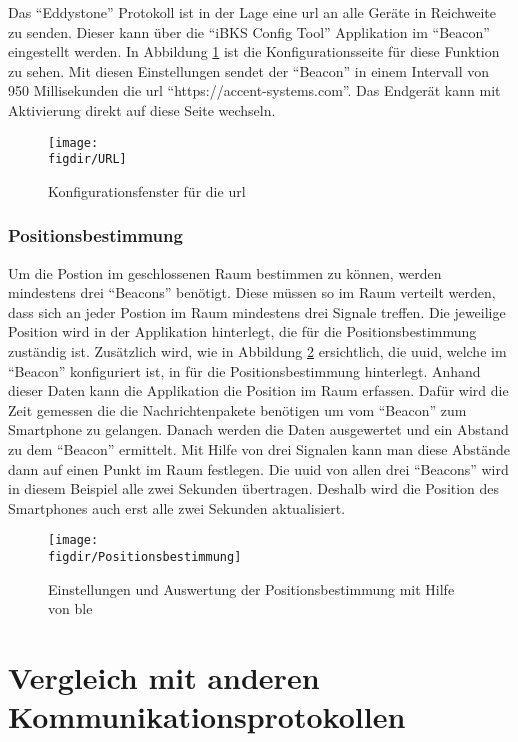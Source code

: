Das "`Eddystone"' Protokoll ist in der Lage eine \ac{url} an alle Geräte in Reichweite zu senden. Dieser kann über die "`iBKS Config Tool"' Applikation im "`Beacon"' eingestellt werden. In Abbildung \ref{FIG:url} ist die Konfigurationsseite für diese Funktion zu sehen. Mit diesen Einstellungen sendet der "`Beacon"' in einem Intervall von 950 Millisekunden die \ac{url} "`https://accent-systems.com"'. Das Endgerät kann mit Aktivierung direkt auf diese Seite wechseln.\\   

\begin{figure}[h]
	\centering
	\texttt{[image: \\figdir/URL]}
	\caption{Konfigurationsfenster für die \ac{url}}
	\label{FIG:url}
\end{figure}

\subsubsection{Positionsbestimmung}
\label{sss:ibeacon:position}

Um die Postion im geschlossenen Raum bestimmen zu können, werden mindestens drei "`Beacons"' benötigt. Diese müssen so im Raum verteilt werden, dass sich an jeder Postion im Raum mindestens drei Signale treffen. Die jeweilige Position wird in der Applikation hinterlegt, die für die Positionsbestimmung zuständig ist. Zusätzlich wird, wie in Abbildung \ref{FIG:poition} ersichtlich, die \ac{uuid}, welche im "`Beacon"' konfiguriert ist, in für die Positionsbestimmung hinterlegt. Anhand dieser Daten kann die Applikation die Position im Raum erfassen. Dafür wird die Zeit gemessen die die Nachrichtenpakete benötigen um vom "`Beacon"' zum Smartphone zu gelangen. Danach werden die Daten ausgewertet und ein Abstand zu dem "`Beacon"' ermittelt. Mit Hilfe von drei Signalen kann man diese Abstände dann auf einen Punkt im Raum festlegen. Die \ac{uuid} von allen drei "`Beacons"' wird in diesem Beispiel alle zwei Sekunden übertragen. Deshalb wird die Position des Smartphones auch erst alle zwei Sekunden aktualisiert.\\

\begin{figure}[h]
	\centering
	\texttt{[image: \\figdir/Positionsbestimmung]}
	\caption{Einstellungen und Auswertung der Positionsbestimmung mit Hilfe von \ac{ble}}
	\label{FIG:poition}
\end{figure}

\section{Vergleich mit anderen Kommunikationsprotokollen}
\label{s:vergleich}

